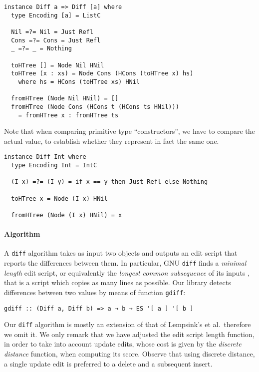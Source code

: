 \documentclass{sigplanconf}
\theoremstyle{plain}
\begin{document}
\begin{verbatim}
instance Diff a => Diff [a] where	
  type Encoding [a] = ListC

  Nil =?= Nil = Just Refl
  Cons =?= Cons = Just Refl
  _ =?= _ = Nothing

  toHTree [] = Node Nil HNil
  toHTree (x : xs) = Node Cons (HCons (toHTree x) hs)
    where hs = HCons (toHTree xs) HNil

  fromHTree (Node Nil HNil) = []
  fromHTree (Node Cons (HCons t (HCons ts HNil))) 
    = fromHTree x : fromHTree ts
\end{verbatim} 
%
Note that when comparing primitive type ``constructors'', we have to
compare the actual value, to establish whether they represent in fact
the same one.
\begin{verbatim}
instance Diff Int where
  type Encoding Int = IntC

  (I x) =?= (I y) = if x == y then Just Refl else Nothing
  
  toHTree x = Node (I x) HNil
  
  fromHTree (Node (I x) HNil) = x
\end{verbatim}
%
%

\paragraph{Algorithm}
A  \texttt{diff} algorithm takes as input two objects and outputs an
edit script that reports the differences between them.
%
In particular, GNU \texttt{diff} finds a \emph{minimal length} edit
script, or equivalently the \emph{longest common subsequence} of its
inputs \cite{Berg00, PierceDiff3}, that is a script which 
copies as many lines as possible.
%
Our library detects differences between two values by means of function \texttt{gdiff}:
\begin{verbatim}
gdiff :: (Diff a, Diff b) => a → b → ES '[ a ] '[ b ]
\end{verbatim}
%
Our \texttt{diff} algorithm is mostly an extension of that of
Lempsink's et al.\ therefore we omit it.
%
We only remark that we have adjusted the edit script length function,
in order to take into account update edits, whose cost is given by the
\emph{discrete distance} function, when computing its score.
%
%
Observe that using discrete distance, a single update edit is
preferred to a delete and a subsequent insert.
%
\end{document}
